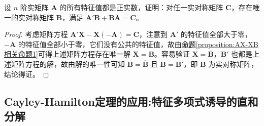 \documentclass[../../main.tex]{subfiles}%
\begin{document}
\begin{example}
设 \(n\) 阶实矩阵 \(\boldsymbol{A}\) 的所有特征值都是正实数，证明：对任一实对称矩阵 \(\boldsymbol{C}\)，存在唯一的实对称矩阵 \(\boldsymbol{B}\)，满足 \(\boldsymbol{A}'\boldsymbol{B} + \boldsymbol{B}\boldsymbol{A} = \boldsymbol{C}\)。
\end{example}
\begin{proof}

考虑矩阵方程 \(\boldsymbol{A}'\boldsymbol{X} - \boldsymbol{X}(-\boldsymbol{A}) = \boldsymbol{C}\)，注意到 \(\boldsymbol{A}'\) 的特征值全部大于零，\(-\boldsymbol{A}\) 的特征值全部小于零，它们没有公共的特征值，故由\hyperref[proposition:AX-XB相关命题1]{命题\ref{proposition:AX-XB相关命题1}}可得上述矩阵方程存在唯一解 \(\boldsymbol{X = B}\)。容易验证 \(\boldsymbol{X = \overline{B}}\)，\(\boldsymbol{B}'\) 也都是上述矩阵方程的解，故由解的唯一性可知 \(\boldsymbol{B = \overline{B}}\) 且 \(\boldsymbol{B = B'}\)，即 \(\boldsymbol{B}\) 为实对称矩阵，结论得证。

\end{proof}


\subsection{Cayley-Hamilton定理的应用:特征多项式诱导的直和分解}
\end{document}
